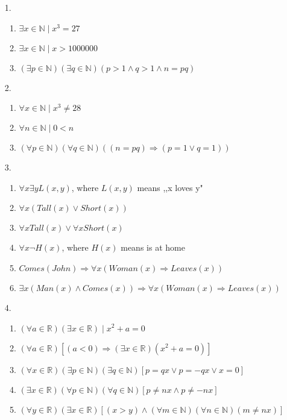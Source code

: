 \documentclass[11pt]{exam}
\author{@dantevangelista}
\begin{document}

\begin{enumerate}[leftmargin=0pt]

\item[1.]
\begin{enumerate}[label=(\alph*)]
    \item $\exists x \in \mathbb{N} \mid x^3 = 27$
    \item $\exists x \in \mathbb{N} \mid x > 1000000$
    \item $(\exists p \in \mathbb{N})(\exists q \in \mathbb{N})(p > 1 \land q > 1 \land n = pq)$
\end{enumerate}

\item[2.]
\begin{enumerate}[label=(\alph*)]
    \item $\forall x \in \mathbb{N} \mid x^3 \neq 28$
    \item $\forall n \in \mathbb{N} \mid 0 < n$
    \item $(\forall p \in \mathbb{N})(\forall q \in \mathbb{N})((n = pq) \Rightarrow (p = 1 \lor q = 1))$ 
\end{enumerate}

\item[3.]
\begin{enumerate}[label=(\alph*)]
    \item $\forall x \exists y L(x,y)$, where $L(x,y)$ means ,,x loves y"
    \item $\forall x (Tall(x) \lor Short(x))$
    \item $\forall x Tall(x) \lor \forall x Short(x)$
    \item $\forall x \neg H(x)$, where $H(x)$ means is at home
    \item $Comes(John) \Rightarrow \forall x (Woman(x) \Rightarrow Leaves(x))$
    \item $\exists x (Man(x) \land Comes(x)) \Rightarrow \forall x (Woman(x) \Rightarrow Leaves(x))$
\end{enumerate}

\item[4.]
\begin{enumerate}[label=(\alph*)]
    \item $(\forall a \in \mathbb{R}) (\exists x \in \mathbb{R}) \mid x^2 + a = 0$
    \item $(\forall a \in \mathbb{R}) [(a < 0) \Rightarrow (\exists x \in \mathbb{R}) (x^2 + a = 0)]$
    \item $(\forall x \in \mathbb{R})(\exists p \in \mathbb{N})(\exists q \in \mathbb{N})[p = qx \lor p = -qx \lor x = 0]$
    \item $(\exists x \in \mathbb{R})(\forall p \in \mathbb{N})(\forall q \in \mathbb{N})[p \neq nx \land p \neq -nx ]$
    \item $(\forall y \in \mathbb{R})(\exists x \in \mathbb{R})[(x > y) \land (\forall m \in \mathbb{N})(\forall n \in \mathbb{N})(m \neq nx)]$
\end{enumerate}


\end{enumerate}
\end{document}
